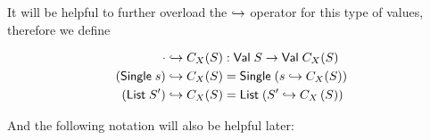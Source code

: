 
It will be helpful to further overload the $\hookrightarrow$ operator for this type of values, therefore we define


\begin{align}
    \cdot \hookrightarrow C_X(S) &: \mathsf{Val} \; S \rightarrow \mathsf{Val} \; C_X(S) \\
    (\mathsf{Single} \; s) \hookrightarrow C_X(S) &= \mathsf{Single} \; (s \hookrightarrow C_X(S)) \\
    (\mathsf{List} \; S') \hookrightarrow C_X(S) &= \mathsf{List} \; (S' \hookrightarrow C_X\left(S\right))
\end{align}


And the following notation will also be helpful later:


